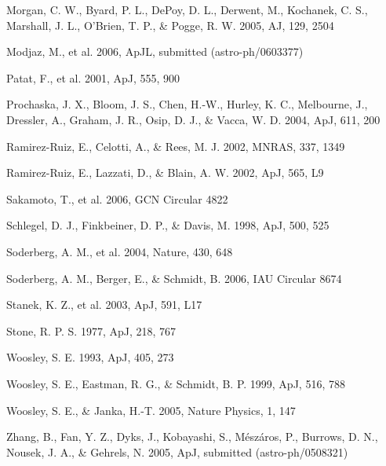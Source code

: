 \documentclass[apj]{emulateapj}
\begin{document}
\begin{thebibliography}{99}
 Morgan, C. W., Byard, P. L., DePoy, D. L.,
Derwent, M., Kochanek, C. S., Marshall, J. L., O'Brien, T. P., \& Pogge, R. W.
2005, AJ, 129, 2504

 Modjaz, M., et al. 2006, ApJL, submitted (astro-ph/0603377)

 Patat, F., et al. 2001, ApJ, 555, 900

 Prochaska, J. X., Bloom, J. S.,
Chen, H.-W., Hurley, K. C., Melbourne, J., Dressler, A., Graham, J. R.,
Osip, D. J., \& Vacca, W. D. 2004, ApJ, 611, 200

Ramirez-Ruiz, E., Celotti, A., \& Rees, M. J. 2002, MNRAS, 337, 1349

 Ramirez-Ruiz, E., Lazzati, D.,
\& Blain, A. W. 2002, ApJ, 565, L9

 Sakamoto, T., et al. 2006, GCN
Circular 4822

 Schlegel, D. J., 
Finkbeiner, D. P., \& Davis, M. 1998, ApJ, 500, 525


 Soderberg, A. M., et al. 2004,
Nature, 430, 648

 Soderberg, A. M., Berger, E.,
\& Schmidt, B. 2006, IAU Circular 8674

 Stanek, K. Z., et al. 2003, ApJ, 591, L17

 Stone, R. P. S. 1977, ApJ, 218, 767

 Woosley, S. E. 1993, ApJ, 405, 273

 Woosley, S. E., Eastman, R. G., \&  
Schmidt, B. P. 1999, ApJ, 516, 788 

 Woosley, S. E., \& Janka, H.-T. 2005, Nature Physics, 1, 147

 Zhang, B., Fan, Y. Z., Dyks, J.,
Kobayashi, S., M\'esz\'aros, P., Burrows, D. N., Nousek, J. A., \& Gehrels, N.
2005, ApJ, submitted (astro-ph/0508321)

\end{thebibliography}
\end{document}
